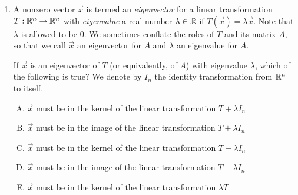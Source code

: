 \documentclass[10pt]{amsart}
\begin{document}
\begin{enumerate}
  {\em Answer}: Option (B)

  {\em Explanation}: Since $T$ is rotation by an {\em irrational}
  multiple $\theta$ of $\pi$, there is no positive integer multiple of
  $\theta$ that is also an integer multiple of $2\pi$. Thus, $T^r$ is
  not the identity map for any positive integer $r$, so there is no
  cycling back, so we do get an infinite set of vectors. All of them
  have the same length as $\vec{x}$, because rotations preserve
  length. Thus, they lie on the circle centered at the origin with
  length equal to the length of the vector $\vec{x}$. In fact, we can
  show that they form a dense subset of the circle, i.e., they come
  arbitrarily close to every point of the circle. Note, however, that
  we do not get all points on the circle. For instance, $-\vec{x}$ is
  not in the range, because achieving it would require a nonzero
  rational (in fact, odd integer) multiple of $\pi$, and no integer
  multiple of an irrational multiple of $\pi$ is of that form.

  {\em Performance review}: 13 out of 24 got this. 8 chose (C), 2
  chose (D), 1 chose (A).

  {\em Historical note (last time)}: $9$ out of $24$ got this. $4$ chose (A),
  $7$ chose (C), $3$ chose (D), $1$ chose (E).

  \vspace{0.6in}

  We return to generic $n$ now.

\item A nonzero vector $\vec{x}$ is termed an {\em eigenvector} for a
  linear transformation $T: \mathbb{R}^n \to \mathbb{R}^n$ with {\em eigenvalue} a
  real number $\lambda \in \mathbb{R}$ if $T(\vec{x}) = \lambda\vec{x}$. Note
  that $\lambda$ is allowed to be $0$. We sometimes conflate the roles
  of $T$ and its matrix $A$, so that we call $\vec{x}$ an eigenvector
  for $A$ and $\lambda$ an eigenvalue for $A$.

  If $\vec{x}$ is an eigenvector of $T$ (or equivalently, of $A$) with
  eigenvalue $\lambda$, which of the following is true? We denote by
  $I_n$ the identity transformation from $\mathbb{R}^n$ to itself.

  \begin{enumerate}[(A)]
  \item $\vec{x}$ must be in the kernel of the linear transformation
    $T + \lambda I_n$
  \item $\vec{x}$ must be in the image of the linear transformation $T
    + \lambda I_n$
  \item $\vec{x}$ must be in the kernel of the linear transformation
    $T - \lambda I_n$
  \item $\vec{x}$ must be in the image of the linear transformation $T
    - \lambda I_n$
  \item $\vec{x}$ must be in the kernel of the linear transformation
    $\lambda T$
  \end{enumerate}


\end{enumerate}
\end{document}
